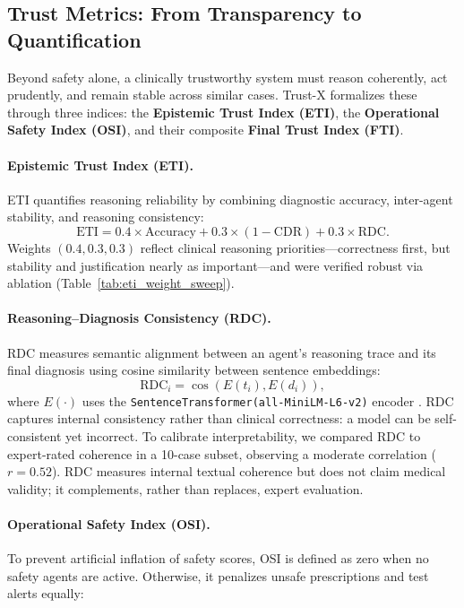 \documentclass[letterpaper]{article} %
\begin{document}
\subsection{Trust Metrics: From Transparency to Quantification}

Beyond safety alone, a clinically trustworthy system must reason coherently, act prudently, and remain stable across similar cases. 
Trust-X formalizes these through three indices: the \textbf{Epistemic Trust Index (ETI)}, the \textbf{Operational Safety Index (OSI)}, and their composite \textbf{Final Trust Index (FTI)}.

\paragraph{Epistemic Trust Index (ETI).}
ETI quantifies reasoning reliability by combining diagnostic accuracy, inter-agent stability, and reasoning consistency:
\[
\mathrm{ETI} = 0.4 \times \mathrm{Accuracy} + 0.3 \times (1 - \mathrm{CDR}) + 0.3 \times \mathrm{RDC}.
\]
Weights $(0.4, 0.3, 0.3)$ reflect clinical reasoning priorities—correctness first, but stability and justification nearly as important—and were verified robust via ablation (Table~\ref{tab:eti_weight_sweep}). 

\paragraph{Reasoning–Diagnosis Consistency (RDC).}
RDC measures semantic alignment between an agent’s reasoning trace and its final diagnosis using cosine similarity between sentence embeddings:
\[
\mathrm{RDC}_i = \cos(E(t_i), E(d_i)),
\]
where $E(\cdot)$ uses the \texttt{SentenceTransformer(all-MiniLM-L6-v2)} encoder \cite{reimers2019sentencebert}.  
RDC captures internal consistency rather than clinical correctness: a model can be self-consistent yet incorrect. 
To calibrate interpretability, we compared RDC to expert-rated coherence in a 10-case subset, observing a moderate correlation ($r{=}0.52$). RDC measures internal textual coherence but does not claim medical validity; it complements, rather than replaces, expert evaluation.

\paragraph{Operational Safety Index (OSI).}
To prevent artificial inflation of safety scores, OSI is defined as zero when no safety agents are active.
Otherwise, it penalizes unsafe prescriptions and test alerts equally:
\end{document}
